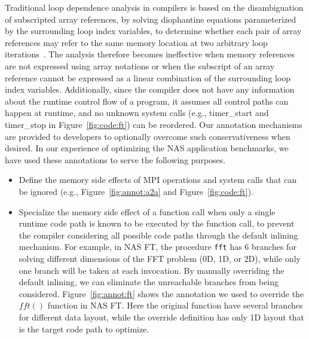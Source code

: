 Traditional loop dependence analysis in compilers is based on the disambiguation of subscripted array references, 
by solving diophantine equations parameterized by the surrounding loop index variables, to determine whether each pair of 
array references may refer to the same memory location at two arbitrary loop iterations~\cite{AK:Book01}. The analysis therefore
becomes ineffective when memory references are not expressed using array notations or when the subscript of an array reference cannot be expressed as a linear combination of the surrounding loop index variables. Additionally, since the compiler does not have any information about the runtime control flow of a program, it assumes all control paths can happen at runtime, and no unknown system calls (e.g., timer\_start and timer\_stop in Figure~\ref{fig:code:ft}) can be reordered. Our annotation mechanisms are provided to developers to optionally overcome such conservativeness when desired. In our experience of optimizing the NAS application benchmarks, we have used these annotations to serve the following purposes. 

\begin{itemize}
\item Define the memory side effects of MPI operations and system calls that can be ignored (e.g., Figure~\ref{fig:annot:a2a} and Figure~\ref{fig:code:ft}).

\item Specialize the memory side effect of a function call when only a single runtime code path is known to be executed by the function call,  to prevent the compiler considering all possible code paths through the default inlining mechanism.  For
  example, in NAS FT, the procedure \texttt{fft} has 6 branches for
  solving different dimensions of the FFT problem (0D, 1D, or 2D),
  while only one branch will be taken at each invocation.  By manually
  overriding the default inlining, we can eliminate the unreachable
  branches from being considered.
  Figure~\ref{fig:annot:ft} shows the annotation we used to override the $fft()$
function in NAS FT.  Here the original function have several branches for
different data layout, while the override definition has only 1D
layout that is the target code path to optimize.



\end{itemize}


